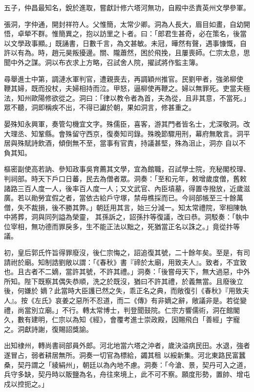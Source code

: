 \begin{pinyinscope}
 五子，仲昌最知名，銳於進取，嘗獻計修六塔河無功，自殿中丞責英州文學參軍。



 張洞，字仲通，開封祥符人。父惟簡，太常少卿。洞為人長大，眉目如畫，自幼開悟，卓犖不群。惟簡異之，抱以訪里之卜者。曰：「郎君生甚奇，必在策名，後當以文學政事顯。」既誦書，日數千言，為文甚敏。未冠，曄然有聲，遇事慷慨，自許以有為。時，趙元昊叛擾邊。關、隴蕭然，困於飛挽，且屢喪師。仁宗太息，思聞中外之謀。洞以布衣求上方略，召試舍人院，擢試將作監主簿。



 尋舉進士中第，調漣水軍判官，遭親喪去，再調穎州推官。民劉甲者，強弟柳使
 鞭其婦，既而投杖，夫婦相持而泣。甲怒，逼柳使再鞭之。婦以無罪死。吏當夫極法，知州歐陽修欲從之。洞曰：「律以教令者為首，夫為從，且非其意，不當死。」眾不聽，洞即稱疾不出，不得已讞於朝，果如洞言，修甚重之。



 晏殊知永興軍，奏管勾機宜文字。殊儒臣，喜客，游其門者皆名士，尤深敬洞。改大理丞、知鞏縣。會殊留守西京，復奏知司錄。殊晚節驟用刑，幕府無敢言。洞平居與殊賦詩飲酒，傾倒無不至，當事有官責，持議甚堅，殊為沮止，洞亦
 自以不負其知。



 樞密副使高若訥、參知政事吳育薦其文學，宜為館職，召試學士院，充秘閣校理、判祠部。時天下戶口日蕃，民去為僧者眾。洞奏：「至和元年，敕增歲度僧，舊敕諸路三百人度一人，後率百人度一人；又文武官、內臣墳墓，得置寺撥放，近歲滋廣。若以勛勞宜假之者，當依古給戶守塚，禁毋樵採而已。今祠部帳至三十餘萬僧，失不裁損，後不勝其弊。」朝廷用其言，始三分減一。知太常禮院，宰相陳執中將葬，洞與同列謚為榮靈，
 其孫訴之，詔孫抃等復議，改曰恭。洞駁奏：「執中位宰相，無功德而罪戾多，生不能正法以黜之，死猶當正名以誅之。」竟從抃等議。



 初，皇后郭氏忤旨得罪廢沒，後仁宗悔之，詔追復其號，二十餘年矣。至是，有司請祔於廟。知制誥劉敞以謂：「《春秋》書『禘於太廟，用致夫人』。致者，不宜致也。且古者不二嫡，當許其號，不許其禮。」洞奏：「後嘗母天下，無大過惡，中外所知。陛下既察其偶失恭順，洗之於既沒，猶曰不許其禮，於義無當。且廢後立後，何嫌於
 嫡？此當時大臣護已然之失，乖正名之典，而敞復引《春秋》『用致夫人』。按《左氏》哀姜之惡所不忍道，而二《傳》有非嫡之辭，敞議非是。若從變禮，尚當別立廟。」不行。轉太常博士，判登聞鼓院。仁宗方響儒術，洞在館閣久，數有建明，仁宗以為知《經》，會覆考進士崇政殿，因賜飛白「善經」字寵之。洞獻詩謝，復賜詔獎諭。



 出知棣州，轉尚書祠部員外郎。河北地當六塔之沖者，歲決溢病民田。水退，強者遂冒占，弱者耕居無所。洞奏一切官為標給，蠲其租
 以綏新集。河北東路民富蠶桑，契丹謂之「綾絹州」，朝廷以為內地不慮。洞奏：「今滄、景，契丹可入之道，兵守多缺，契丹時以販鹽為名，舟往來境上，此不可不察。願度形勢，置帥、增屯戍以控扼之。」




\end{pinyinscope}
